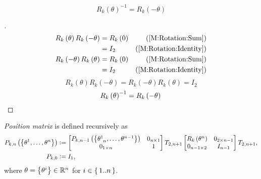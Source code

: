 \documentclass[../main.tex]{subfiles}
\begin{document}
\begin{corollary}\label{M:Rotation:Inverse}
    \begin{equation*}
        R_k\left(\theta\right)^{-1} = R_k\left(-\theta\right)
    \end{equation*}
\end{corollary}
\begin{proof}[]
    \begin{align*}
        R_k\left(\theta\right)R_k\left(-\theta\right)
         & = R_k\left(0\right) & \text{(\cref{M:Rotation:Sum})}      \\
         & = I_2               & \text{(\cref{M:Rotation:Identity})} \\
        R_k\left(-\theta\right)R_k\left(\theta\right)
         & = R_k\left(0\right) & \text{(\cref{M:Rotation:Sum})}      \\
         & = I_2               & \text{(\cref{M:Rotation:Identity})}
    \end{align*}
    \begin{equation*}
        R_k\left(\theta\right)R_k\left(-\theta\right)
        = R_k\left(-\theta\right)R_k\left(\theta\right)
        = I_2
    \end{equation*}
    \begin{equation*}
        {R_k\left(\theta\right)}^{-1}
        =
        R_k\left(-\theta\right)
        \qedhere
    \end{equation*}
\end{proof}
\begin{definition}\label{M:Position}
    \textit{Position matrix} is defined recursively as
    \begin{align*}
        P_{k,n}\left(\left\{\tensor{\theta}{^1},\dots,\tensor{\theta}{^n}\right\}\right) & \defeq
        \begin{bmatrix}
            P_{k,n-1}\left(\left\{\tensor{\theta}{^1_{n}},\dots,\tensor{\theta}{^{n-1}}\right\}\right) & 0_{n\times 1} \\
            0_{1\times n}                                                                              & 1             \\
        \end{bmatrix}
        T_{2,n+1}
        \begin{bmatrix}
            R_k\left(\tensor{\theta}{^n}\right) & 0_{{2}\times{n-1}} \\
            0_{{n-1}\times{2}}                  & {I}_{n-1}          \\
        \end{bmatrix}
        T_{2,n+1} \text{,}                                                                                    \\
        P_{k,0}                                                                          & \defeq I_1\text{,}
    \end{align*}
    where $\theta=\left\{\tensor{\theta}{^i}\right\}\in\R^n$ for $i\in\set{1..n}$.
\end{definition}
\end{document}
